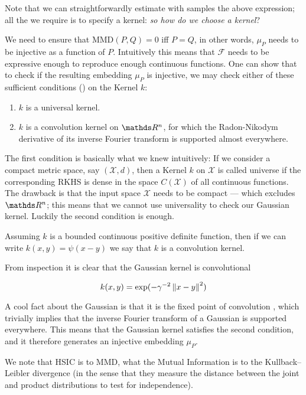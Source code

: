 Note that we can straightforwardly estimate with samples the above expression; all the we require is 
to specify a kernel: \textit{so how do we choose a kernel}?

We need to ensure that $\text{MMD}(P, Q) = 0$ iff $P = Q$, in other words, $\mu_P$ needs to be injective
as a function of $P$. Intuitively this means that $\mathcal{F}$ needs to be expressive enough to 
reproduce enough continuous functions. One can show that to check if the resulting embedding 
$\mu_P$ is injective, we may check either of these sufficient conditions (\cite{sriperumbudur2008injective}) 
on the Kernel $k$:

\begin{enumerate}
    \item $k$ is a universal kernel.
    \item $k$ is a convolution kernel on $\R^n$, for which the Radon-Nikodym derivative of 
    its inverse Fourier transform is supported almost everywhere.
\end{enumerate}

The first condition is basically what we knew intuitively: 
If we consider a compact metric space, say $(\mathcal{X}, d)$, then a Kernel $k$ on $\mathcal{X}$
is called universe if the corresponding RKHS is dense 
in the space $C(\mathcal{X})$ of all continuous functions. The drawback is that the input space $\mathcal{X}$ needs to be compact --- which excludes $\R^n$; 
this means that we cannot use universality to check our Gaussian kernel. Luckily the second condition
is enough.

Assuming $k$ is a bounded continuous positive definite function, then if we can write
$k(x, y) = \psi (x - y)$ we say that $k$ is a convolution kernel.

From inspection it is clear that the Gaussian kernel is convolutional

$$
    k(x, y) = \exp (-\gamma^{-2}\left\lVert x - y\right\rVert^2)
$$

A cool fact about the Gaussian is that it is the fixed point of convolution
, which trivially implies
that the inverse Fourier transform of a Gaussian is supported everywhere. 
 This means that the Gaussian kernel satisfies the second
condition, and it therefore generates an injective embedding $\mu_P$.

We note that HSIC is to MMD, what the Mutual Information is to the Kullback–Leibler divergence (in the 
sense that they measure the distance between the joint and product distributions to test for independence).

